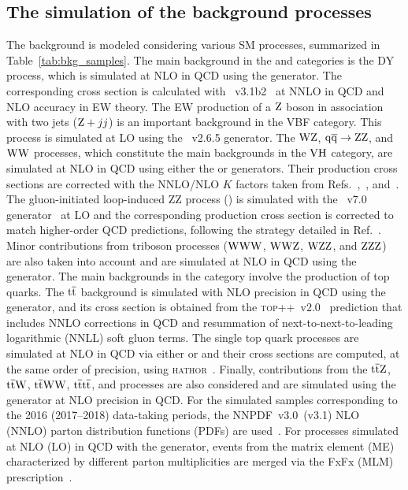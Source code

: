 \bigskip
\subsection{The simulation of the background processes}
The background is modeled considering various SM processes, summarized in Table~\ref{tab:bkg_samples}.
The main background in the \ggH and \qqH categories is the DY process, which is simulated at NLO in QCD using the \MGvATNLO generator. 
The corresponding cross section is calculated with \FEWZ~v3.1b2~\cite{Li:2012wna} at NNLO in QCD and NLO accuracy in EW theory. 
The EW production of a $\mathrm{Z}$ boson in association with two jets ($\mathrm{Z}+jj$) is an important background in the VBF category. 
This process is simulated at LO using the \MGvATNLO~v2.6.5 generator. 
The $\mathrm{W}\mathrm{Z}$, ${\mathrm{q}\overline{\mathrm{q}}\to\mathrm{Z}\mathrm{Z}}$, and $\mathrm{W}\mathrm{W}$ processes, which constitute the main backgrounds in the $\mathrm{V}\mathrm{H}$ category, 
are simulated at NLO in QCD using either the \POWHEG or \MGvATNLO generators. 
Their production cross sections are corrected with the NNLO/NLO $K$ factors taken from Refs.~\cite{Grazzini:2017ckn},~\cite{Grazzini:2015hta}, and~\cite{Gehrmann:2014fva}. 
The gluon-initiated loop-induced ZZ process (\ggZZ) is simulated with the \MCFM~v7.0 generator~\cite{Campbell:2011bn} at LO 
and the corresponding production cross section is corrected to match higher-order QCD predictions, following the strategy detailed in Ref.~\cite{Sirunyan:2017exp}. 
Minor contributions from triboson processes ($\mathrm{W}\mathrm{W}\mathrm{W}$, $\mathrm{W}\mathrm{W}\mathrm{Z}$, $\mathrm{W}\mathrm{Z}\mathrm{Z}$, and $\mathrm{Z}\mathrm{Z}\mathrm{Z}$) are also taken into account and are simulated at NLO in QCD using the \MGvATNLO generator. 
The main backgrounds in the \ttH category involve the production of top quarks. 
The $\mathrm{t}\overline{\mathrm{t}}$ background is simulated with NLO precision in QCD using the \POWHEG generator, and its cross section is obtained from the \textsc{top++}~v2.0~\cite{Czakon:2011xx} prediction 
that includes NNLO corrections in QCD and resummation of next-to-next-to-leading logarithmic (NNLL) soft gluon terms. 
The single top quark processes are simulated at NLO in QCD via either \POWHEG or \MGvATNLO and their cross sections are computed, 
at the same order of precision, using \textsc{hathor}~\cite{Kant:2014oha}. 
Finally, contributions from the $\mathrm{t}\overline{\mathrm{t}}\mathrm{Z}$, $\mathrm{t}\overline{\mathrm{t}}\mathrm{W}$, $\mathrm{t}\overline{\mathrm{t}}\mathrm{W}\mathrm{W}$, ${\mathrm{t}\overline{\mathrm{t}}\mathrm{t}\overline{\mathrm{t}}}$, and \tZq processes 
are also considered and are simulated using the \MGvATNLO generator at NLO precision in QCD. 
For the simulated samples corresponding to the 2016 (2017--2018) data-taking periods, the NNPDF~v3.0~(v3.1) NLO (NNLO) parton distribution functions (PDFs) are used~\cite{Ball:2014uwa,Ball:2017nwa}. 
For processes simulated at NLO (LO) in QCD with the \MGvATNLO generator, events from the matrix element (ME) characterized by different parton multiplicities are merged via the FxFx (MLM) prescription~\cite{Alwall:2007fs,Frederix:2012ps}.


